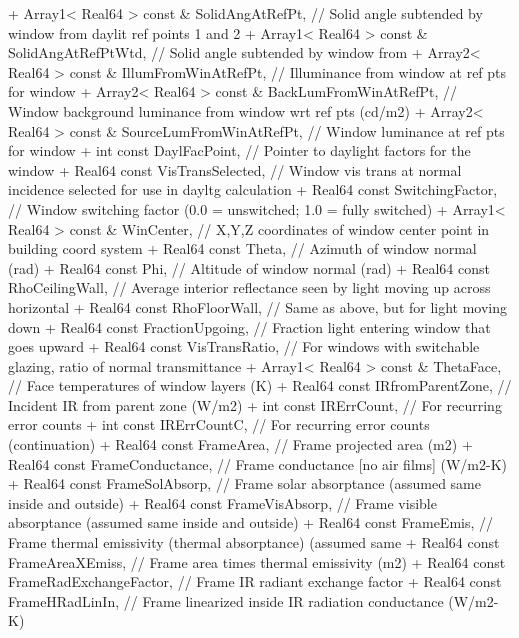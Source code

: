 \begin{DoxyCode}
+           Array1< Real64 > const & SolidAngAtRefPt, // Solid angle subtended by window from daylit ref
       points 1 and 2
+           Array1< Real64 > const & SolidAngAtRefPtWtd, // Solid angle subtended by window from
+           Array2< Real64 > const & IllumFromWinAtRefPt, // Illuminance from window at ref pts for window
+           Array2< Real64 > const & BackLumFromWinAtRefPt, // Window background luminance from window wrt
       ref pts (cd/m2)
+           Array2< Real64 > const & SourceLumFromWinAtRefPt, // Window luminance at ref pts for window
+           int const DaylFacPoint, // Pointer to daylight factors for the window
+           Real64 const VisTransSelected, // Window vis trans at normal incidence selected for use in
       dayltg calculation
+           Real64 const SwitchingFactor, // Window switching factor (0.0 = unswitched; 1.0 = fully
       switched)
+           Array1< Real64 > const & WinCenter, // X,Y,Z coordinates of window center point in building
       coord system
+           Real64 const Theta, // Azimuth of window normal (rad)
+           Real64 const Phi, // Altitude of window normal (rad)
+           Real64 const RhoCeilingWall, // Average interior reflectance seen by light moving up across
       horizontal
+           Real64 const RhoFloorWall, // Same as above, but for light moving down
+           Real64 const FractionUpgoing, // Fraction light entering window that goes upward
+           Real64 const VisTransRatio, // For windows with switchable glazing, ratio of normal
       transmittance
+           Array1< Real64 > const & ThetaFace, // Face temperatures of window layers (K)
+           Real64 const IRfromParentZone, // Incident IR from parent zone (W/m2)
+           int const IRErrCount, // For recurring error counts
+           int const IRErrCountC, // For recurring error counts (continuation)
+           Real64 const FrameArea, // Frame projected area (m2)
+           Real64 const FrameConductance, // Frame conductance [no air films] (W/m2-K)
+           Real64 const FrameSolAbsorp, // Frame solar absorptance (assumed same inside and outside)
+           Real64 const FrameVisAbsorp, // Frame visible absorptance (assumed same inside and outside)
+           Real64 const FrameEmis, // Frame thermal emissivity (thermal absorptance) (assumed same
+           Real64 const FrameAreaXEmiss, // Frame area times thermal emissivity (m2)
+           Real64 const FrameRadExchangeFactor, // Frame IR radiant exchange factor
+           Real64 const FrameHRadLinIn, // Frame linearized inside IR radiation conductance (W/m2-K)

\end{DoxyCode}
